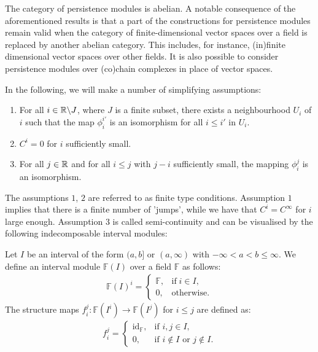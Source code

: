 The category of persistence modules is abelian. A notable consequence of the aforementioned results is that a part of the constructions for persistence modules remain valid when the category of finite-dimensional vector spaces over a field is replaced by another abelian category. This includes, for instance, (in)finite dimensional vector spaces over other fields. It is also possible to consider persistence modules over (co)chain complexes in place of vector spaces.

In the following, we will make a number of simplifying assumptions:

\begin{assume}\noindent
\begin{enumerate}
	\item For all $i \in {\mathbb{R}}\backslash J$, where $J$ is a finite subset, there exists a neighbourhood $U_i$ of $i$ such that the map $\phi_i^{i'}$ is an isomorphism for all $i\leq i'$ in $U_i$.
	\item $C^i = 0$ for $i$ sufficiently small.
	\item For all $j \in {\mathbb{R}}$ and for all $i \leq j$ with $j-i$ sufficiently small, the mapping $\phi_i^j$ is an isomorphism.
\end{enumerate}
\end{assume}

The assumptions $1$, $2$ are referred to as finite type conditions. Assumption $1$ implies that there is a finite number of 'jumps', while we have that $C^i = C^\infty$ for $i$ large enough. Assumption $3$ is called semi-continuity and can be visualised by the following indecomposable interval modules:

\begin{definition}
Let $I$ be an interval of the form $(a,b]$ or $(a,\infty)$ with $-\infty < a < b \leq \infty$. We define an interval module $\mathbb{F}(I)$ over a field $\mathbb{F}$ as follows:
\begin{align}
	\mathbb{F}(I)^i = 
	\begin{cases}
		\mathbb{F}, & \text{if} \; i \in I, \\
		0, & \text{otherwise}.
	\end{cases}
\end{align}
The structure maps $f_{i}^j: \mathbb{F}(I^i) \to \mathbb{F}(I^j)$ for $i \leq j$ are defined as:
\begin{align}
	f_{i}^j = 
	\begin{cases}
		\mathrm{id}_{\mathbb{F}}, & \text{if } i, j \in I, \\
		0, & \text{if } i \notin I \text{ or } j \notin I.
	\end{cases}
\end{align}
\end{definition}

